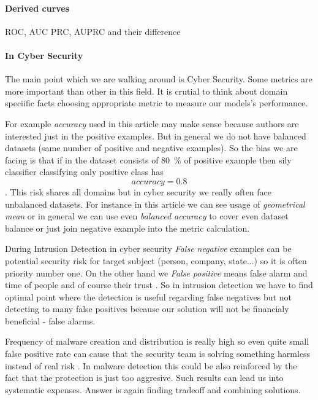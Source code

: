 \paragraph{Derived curves}
ROC, AUC \cite{Fawcett2006}
PRC, AUPRC \cite{Flach2015}
and their difference

\paragraph{In Cyber Security}
The main point which we are walking around is Cyber Security. Some metrics are more important than other in this field. It is crutial to think about domain speciific facts choosing appropriate metric to measure our models's performance.

For example \emph{accuracy} used in this article \cite{Ghanaei2016} may make sense because authors are interested just in the positive examples. But in general we do not have balanced datasets (same number of positive and negative examples). So the bias we are facing is that if in the dataset consists of 80~\% of positive example then sily classifier classifying only positive class has $$accuracy=0.8$$. This risk shares all domains but in cyber security we really often face unbalanced datasets. For instance in this article \cite{Hernandez-Callejo2019} we can see usage of \emph{geometrical mean} or in general we can use even \emph{balanced accuracy} to cover even dataset balance or just join negative example into the metric calculation.


During Intrusion Detection in cyber security \emph{False negative} examples can be potential security risk for target subject (person, company, state...) so it is often priority number one. On the other hand we \emph{False positive} means false alarm and time of people and of course their trust \cite{owaspintrusion}. So in intrusion detection we have to find optimal point where the detection is useful regarding false negatives but not detecting to many false positives because our solution will not be financialy beneficial - false alarms.

Frequency of malware creation and distribution is really high so even quite small false positive rate can cause that the security team is solving something harmless instead of real risk \cite{Apruzzese2018}. In malware detection this could be also reinforced by the fact that the protection is just too aggresive. Such results can lead us into systematic expenses. Answer is again finding tradeoff and combining solutions.\cite{Kubovic2017}

